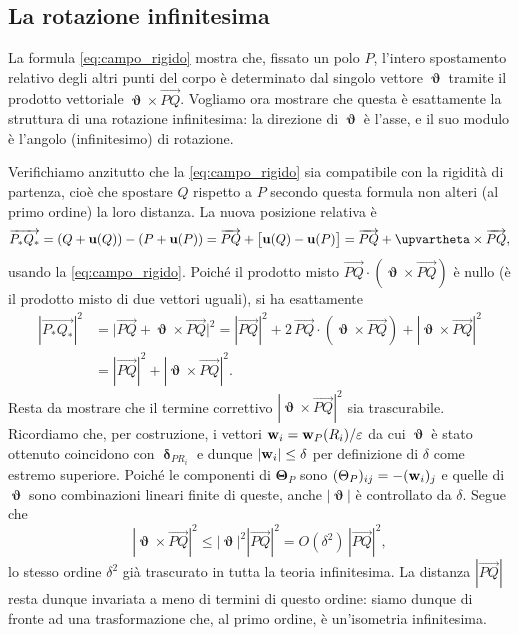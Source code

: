 \subsection{La rotazione infinitesima}\label{sez:interpretazione}

La formula \eqref{eq:campo_rigido} mostra che, fissato un polo $P$, l'intero spostamento relativo degli altri punti del corpo è determinato dal singolo vettore $\bm\upvartheta$ tramite il prodotto vettoriale $\bm\upvartheta\times\overrightarrow{PQ}$. Vogliamo ora mostrare che questa è esattamente la struttura di una rotazione infinitesima: la direzione di $\bm\upvartheta$ è l'asse, e il suo modulo è l'angolo (infinitesimo) di rotazione.

\medskip


Verifichiamo anzitutto che la \eqref{eq:campo_rigido} sia compatibile con la rigidità di partenza, cioè che spostare $Q$ rispetto a $P$ secondo questa formula non alteri (al primo ordine) la loro distanza. La nuova posizione relativa è
\begin{equation}
	\overrightarrow{P_*Q_*} = (Q+\ub(Q))-(P+\ub(P)) = \overrightarrow{PQ} + \bigl[\ub(Q)-\ub(P)\bigr] = \overrightarrow{PQ} + \bm\upvartheta\times\overrightarrow{PQ},
\end{equation}
usando la \eqref{eq:campo_rigido}. Poiché il prodotto misto $\overrightarrow{PQ}\cdot(\bm\upvartheta\times\overrightarrow{PQ})$ è nullo (è il prodotto misto di due vettori uguali), si ha esattamente
\begin{equation}
\begin{aligned}
		|\overrightarrow{P_*Q_*}|^2 &= \bigl|\overrightarrow{PQ}+\bm\upvartheta\times\overrightarrow{PQ}\bigr|^2
	= |\overrightarrow{PQ}|^2 + 2\,\overrightarrow{PQ}\cdot(\bm\upvartheta\times\overrightarrow{PQ}) + |\bm\upvartheta\times\overrightarrow{PQ}|^2\\
	&= |\overrightarrow{PQ}|^2 + |\bm\upvartheta\times\overrightarrow{PQ}|^2.
\end{aligned}
\end{equation}
 Resta da mostrare che il termine correttivo $|\bm\upvartheta\times\overrightarrow{PQ}|^2$ sia trascurabile. Ricordiamo che, per costruzione, i vettori $\mathbf{w}_i=\mathbf{w}_P(R_i)/\varepsilon$ da cui $\bm\upvartheta$ è stato ottenuto coincidono con $\bm\updelta_{PR_i}$  e dunque $|\mathbf{w}_i|\leq\delta$ per definizione di $\delta$ come estremo superiore. Poiché le componenti di $\bm\Theta_P$ sono $(\Theta_P)_{ij}=-(\mathbf{w}_i)_j$ e quelle di $\bm\upvartheta$ sono combinazioni lineari finite di queste, anche $|\bm\upvartheta|$ è controllato da $\delta$. Segue che
\begin{equation}
	|\bm\upvartheta\times\overrightarrow{PQ}|^2 \leq |\bm\upvartheta|^2|\overrightarrow{PQ}|^2 = O(\delta^2)\,|\overrightarrow{PQ}|^2,
\end{equation}
lo stesso ordine $\delta^2$ già trascurato in tutta la teoria infinitesima. La distanza $|\overrightarrow{PQ}|$ resta dunque invariata a meno di termini di questo ordine: siamo dunque di fronte ad una trasformazione che, al primo ordine, è un'isometria infinitesima. 




